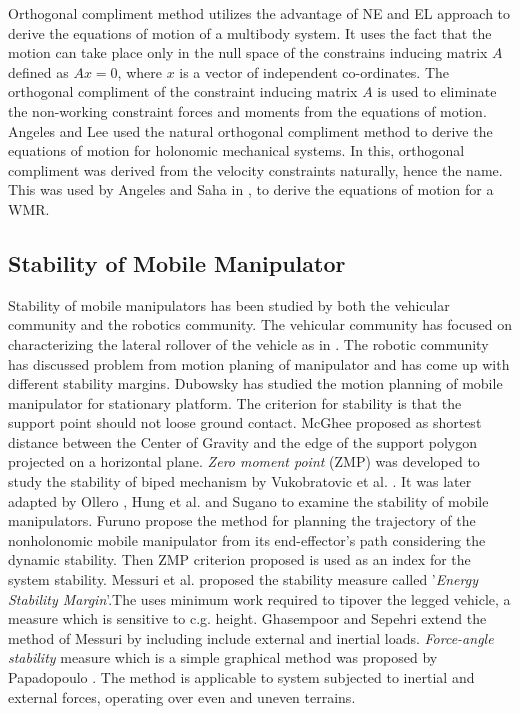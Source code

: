 Orthogonal compliment method utilizes the advantage of NE and EL approach to derive the equations of motion of  a multibody  system.  It uses the fact that the motion can take place only in the null space of the constrains inducing matrix $A$ defined as $Ax=0$, where $x$ is a vector of independent co-ordinates. The orthogonal compliment of the constraint inducing matrix $A$ is used to eliminate the non-working constraint  forces  and moments from the equations of motion.  Angeles and Lee \cite{angeles1988formulation} used the natural orthogonal compliment method to derive the equations of motion for holonomic mechanical systems. In this,  orthogonal compliment was derived from the velocity constraints naturally, hence the name. This was  used by Angeles \cite{angeles2013fundamentals} and Saha in \cite{saha1989kinematics},\cite{saha1991dynamics} to derive the equations of motion for a WMR. 
\subsection{Stability of Mobile Manipulator}
Stability of mobile manipulators has been studied by both the vehicular community and the robotics community. The vehicular community has focused on characterizing the lateral rollover of the vehicle as in  \cite{buchele1990computer,jones1990engineering}. The robotic community has discussed problem from motion planing of manipulator and has come up with different stability margins. Dubowsky \cite{dubowsky1989planning} has studied the motion planning of mobile manipulator for stationary platform. The criterion for stability is that the support point should not loose ground contact. McGhee \cite{mcghee1968stability} proposed as shortest distance between the Center of Gravity  and the edge of the support polygon projected on a horizontal plane. \textit{Zero moment point} (ZMP) was developed to study the stability of biped mechanism by  Vukobratovic et al. \cite{vukobratovic1969contribution,vukobratovic2012biped}. It was later adapted by Ollero \cite{ollero1995stability} , Hung et al. \cite{huang1995manipulator,huang1994stability}  and Sugano \cite{sugano1993stability} to examine the stability of mobile manipulators. Furuno \cite{furuno2003trajectory} propose the method for planning the trajectory of the nonholonomic mobile manipulator from its end-effector's path  considering the dynamic stability. Then ZMP criterion proposed is used as an index for the system stability. Messuri et al. \cite{messuri1985automatic} proposed the stability measure called '\textit{Energy Stability Margin}'.The uses  minimum work required to tipover the legged vehicle, a measure which is sensitive to c.g. height. Ghasempoor and Sepehri \cite{ghasempoor1995measure}  extend the method of Messuri by including include external and inertial loads.   \textit{ Force-angle stability} measure which is a simple graphical method was proposed by Papadopoulo \cite{papadopoulos1996new,papadopoulos2000force}. The method is applicable to system subjected to inertial and external forces, operating over even and uneven terrains. 
